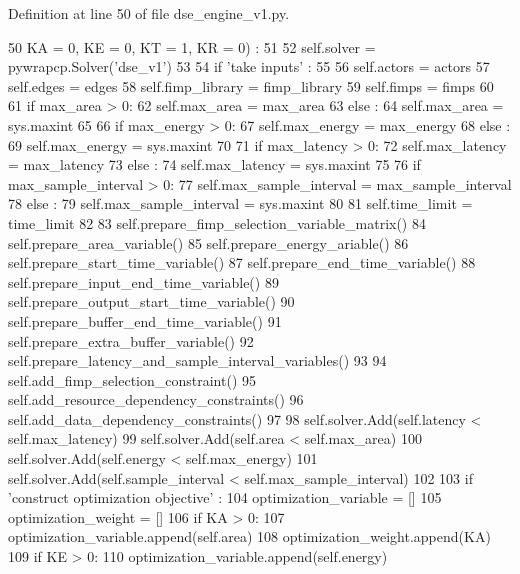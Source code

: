 Definition at line 50 of file dse\+\_\+engine\+\_\+v1.\+py.


\begin{DoxyCode}
50     KA = 0,        KE = 0,          KT = 1,           KR = 0) :
51 
52     self.solver = pywrapcp.Solver(\textcolor{stringliteral}{'dse\_v1'})
53 
54     \textcolor{keywordflow}{if} \textcolor{stringliteral}{'take inputs'} :
55 
56       self.actors = actors
57       self.edges = edges
58       self.fimp\_library = fimp\_library
59       self.fimps = fimps
60 
61       \textcolor{keywordflow}{if} max\_area > 0:
62         self.max\_area = max\_area
63       \textcolor{keywordflow}{else} :
64         self.max\_area = sys.maxint
65 
66       \textcolor{keywordflow}{if} max\_energy > 0:
67         self.max\_energy = max\_energy
68       \textcolor{keywordflow}{else} :
69         self.max\_energy = sys.maxint
70 
71       \textcolor{keywordflow}{if} max\_latency > 0:
72         self.max\_latency = max\_latency
73       \textcolor{keywordflow}{else} :
74         self.max\_latency = sys.maxint
75 
76       \textcolor{keywordflow}{if} max\_sample\_interval > 0:
77         self.max\_sample\_interval = max\_sample\_interval
78       \textcolor{keywordflow}{else} :
79         self.max\_sample\_interval = sys.maxint
80 
81       self.time\_limit = time\_limit
82 
83     self.prepare\_fimp\_selection\_variable\_matrix()
84     self.prepare\_area\_variable()
85     self.prepare\_energy\_ariable()
86     self.prepare\_start\_time\_variable()
87     self.prepare\_end\_time\_variable()
88     self.prepare\_input\_end\_time\_variable()
89     self.prepare\_output\_start\_time\_variable()
90     self.prepare\_buffer\_end\_time\_variable()
91     self.prepare\_extra\_buffer\_variable()
92     self.prepare\_latency\_and\_sample\_interval\_variables()
93 
94     self.add\_fimp\_selection\_constraint()
95     self.add\_resource\_dependency\_constraints()
96     self.add\_data\_dependency\_constraints()
97 
98     self.solver.Add(self.latency < self.max\_latency)
99     self.solver.Add(self.area < self.max\_area)
100     self.solver.Add(self.energy < self.max\_energy)
101     self.solver.Add(self.sample\_interval < self.max\_sample\_interval)
102 
103     \textcolor{keywordflow}{if} \textcolor{stringliteral}{'construct optimization objective'} :
104       optimization\_variable = []
105       optimization\_weight   = []
106       \textcolor{keywordflow}{if} KA > 0:
107         optimization\_variable.append(self.area)
108         optimization\_weight.append(KA)
109       \textcolor{keywordflow}{if} KE > 0:
110         optimization\_variable.append(self.energy)

\end{DoxyCode}
